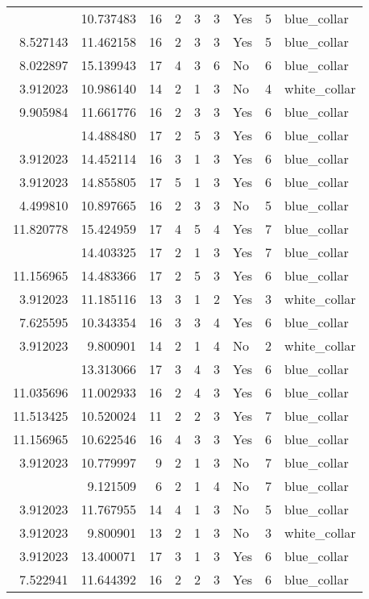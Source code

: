\documentclass[
]{article}
\begin{document}
\begin{longtable}[t]{rrrrrllrl}
\addlinespace
5.135798 & 10.737483 & 16 & 2 & 3 & 3 & Yes & 5 & blue\_collar\\
8.527143 & 11.462158 & 16 & 2 & 3 & 3 & Yes & 5 & blue\_collar\\
8.022897 & 15.139943 & 17 & 4 & 3 & 6 & No & 6 & blue\_collar\\
3.912023 & 10.986140 & 14 & 2 & 1 & 3 & No & 4 & white\_collar\\
9.905984 & 11.661776 & 16 & 2 & 3 & 3 & Yes & 6 & blue\_collar\\
\addlinespace
11.156965 & 14.488480 & 17 & 2 & 5 & 3 & Yes & 6 & blue\_collar\\
3.912023 & 14.452114 & 16 & 3 & 1 & 3 & Yes & 6 & blue\_collar\\
3.912023 & 14.855805 & 17 & 5 & 1 & 3 & Yes & 6 & blue\_collar\\
4.499810 & 10.897665 & 16 & 2 & 3 & 3 & No & 5 & blue\_collar\\
11.820778 & 15.424959 & 17 & 4 & 5 & 4 & Yes & 7 & blue\_collar\\
\addlinespace
3.912023 & 14.403325 & 17 & 2 & 1 & 3 & Yes & 7 & blue\_collar\\
11.156965 & 14.483366 & 17 & 2 & 5 & 3 & Yes & 6 & blue\_collar\\
3.912023 & 11.185116 & 13 & 3 & 1 & 2 & Yes & 3 & white\_collar\\
7.625595 & 10.343354 & 16 & 3 & 3 & 4 & Yes & 6 & blue\_collar\\
3.912023 & 9.800901 & 14 & 2 & 1 & 4 & No & 2 & white\_collar\\
\addlinespace
11.562192 & 13.313066 & 17 & 3 & 4 & 3 & Yes & 6 & blue\_collar\\
11.035696 & 11.002933 & 16 & 2 & 4 & 3 & Yes & 6 & blue\_collar\\
11.513425 & 10.520024 & 11 & 2 & 2 & 3 & Yes & 7 & blue\_collar\\
11.156965 & 10.622546 & 16 & 4 & 3 & 3 & Yes & 6 & blue\_collar\\
3.912023 & 10.779997 & 9 & 2 & 1 & 3 & No & 7 & blue\_collar\\
\addlinespace
3.912023 & 9.121509 & 6 & 2 & 1 & 4 & No & 7 & blue\_collar\\
3.912023 & 11.767955 & 14 & 4 & 1 & 3 & No & 5 & blue\_collar\\
3.912023 & 9.800901 & 13 & 2 & 1 & 3 & No & 3 & white\_collar\\
3.912023 & 13.400071 & 17 & 3 & 1 & 3 & Yes & 6 & blue\_collar\\
7.522941 & 11.644392 & 16 & 2 & 2 & 3 & Yes & 6 & blue\_collar\\

\end{longtable}
\end{document}
